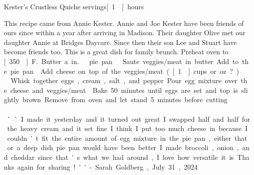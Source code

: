 \begin{recipe}{Kester's Crustless Quiche}
{\unit[6]{servings}}{\unit[1]{hours}}

\freeform This recipe came from Annie Kester. Annie and Joe Kester have been
friends of ours since within a year after arriving in Madison. Their daughter
Olive met our daughter Annie at Bridges Daycare. Since then their son
Lee and Stuart have become friends too. This is a great dish for
family brunch. Preheat oven to \unit[350\0]{F.} Butter a \unit[9]{in.}\
pie pan.

Saute veggies/meat in butter. Add to the pie pan.
Add cheese on top of the veggies/meat. (\unit[1\fr12]{cups} or \unit[6]{oz}?)
\ing[6]{}{eggs}
Whisk together eggs, cream, salt, and pepper. Pour egg mixture over
the cheese and veggies/meat.
\freeform Bake 50 minutes until eggs are set and top is
slightly brown.  Remove from oven and let stand 5 minutes before
cutting.\\\\
``I made it yesterday and it turned out great. I swapped half
and half for the heavy cream and it set fine. I think I put too much
cheese in because I couldn't fit the entire amount of egg mixture in
the pie pan, either that or a deep dish pie pan would have been
better. I made broccoli, onion, and cheddar since that's what we had
around, I love how versatile it is. Thanks again for sharing!'' - Sarah Goldberg, July 31, 2024
\end{recipe}
